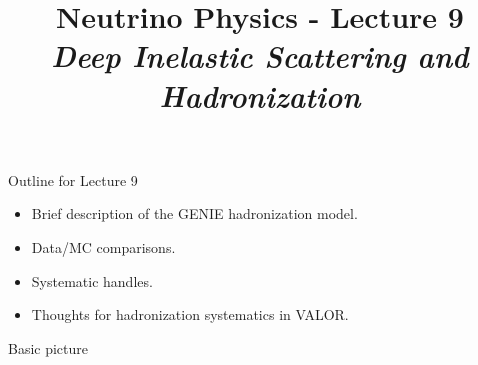 \renewcommand{\thislecture}{9 }

%
%

\title[Neutrino Physics / Lecture \thislecture]
{
  {\huge \color{yellow} Neutrino Physics - Lecture \thislecture} \\
  {\it Deep Inelastic Scattering and Hadronization}\\
}



\begin{frame}[plain]
  \titlepage
\end{frame}

%
%

\begin{frame}{Outline for Lecture \thislecture}

\begin{itemize}
\item Brief description of the GENIE hadronization model.
\item Data/MC comparisons.
\item Systematic handles.
\item Thoughts for hadronization systematics in VALOR.
\end{itemize}

\end{frame}


%
%
%


\begin{frame}{Basic picture}

\end{frame}




